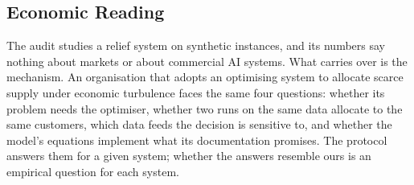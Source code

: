\documentclass[systems,article,accept,moreauthors,pdftex]{Definitions/mdpi}
\begin{document}
\subsection{Economic Reading}
The audit studies a relief system on synthetic instances, and its numbers say nothing about
markets or about commercial AI systems. What carries over is the mechanism. An organisation that
adopts an optimising system to allocate scarce supply under economic turbulence faces the same
four questions: whether its problem needs the optimiser, whether two runs on the same data
allocate to the same customers, which data feeds the decision is sensitive to, and whether the
model's equations implement what its documentation promises. The protocol answers them for a given
system; whether the answers resemble ours is an empirical question for each system.
\end{document}
